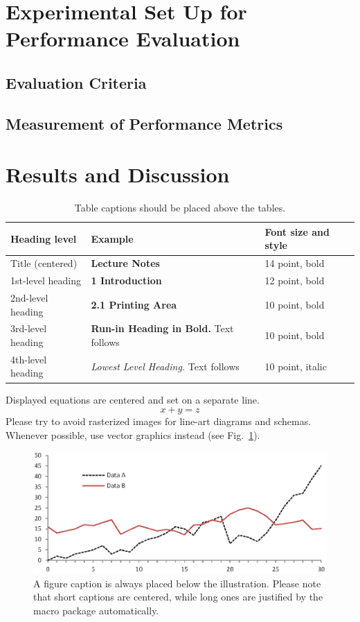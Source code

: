 \documentclass[runningheads]{llncs}
\begin{document}
\section{Experimental Set Up for Performance Evaluation}
\subsection{Evaluation Criteria}
\subsection{Measurement of Performance Metrics}
\section{Results and Discussion}


\begin{table}
\caption{Table captions should be placed above the
tables.}\label{tab1}
\begin{tabular}{|l|l|l|}
\hline
Heading level &  Example & Font size and style\\
\hline
Title (centered) &  {\Large\bfseries Lecture Notes} & 14 point, bold\\
1st-level heading &  {\large\bfseries 1 Introduction} & 12 point, bold\\
2nd-level heading & {\bfseries 2.1 Printing Area} & 10 point, bold\\
3rd-level heading & {\bfseries Run-in Heading in Bold.} Text follows & 10 point, bold\\
4th-level heading & {\itshape Lowest Level Heading.} Text follows & 10 point, italic\\
\hline
\end{tabular}
\end{table}


\noindent Displayed equations are centered and set on a separate
line.
\begin{equation}
x + y = z
\end{equation}
Please try to avoid rasterized images for line-art diagrams and
schemas. Whenever possible, use vector graphics instead (see
Fig.~\ref{fig1}).

\begin{figure}
\includegraphics[width=\textwidth]{fig1.eps}
\caption{A figure caption is always placed below the illustration.
Please note that short captions are centered, while long ones are
justified by the macro package automatically.} \label{fig1}
\end{figure}
\end{document}
